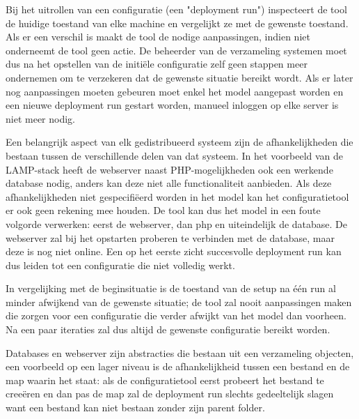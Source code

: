 Bij het uitrollen van een configuratie (een "deployment run") inspecteert de tool de huidige toestand van elke machine en vergelijkt ze met de gewenste toestand.
Als er een verschil is maakt de tool de nodige aanpassingen, indien niet onderneemt de tool geen actie.
De beheerder van de verzameling systemen moet dus na het opstellen van de initi\"ele configuratie zelf geen stappen meer ondernemen om te verzekeren dat de gewenste situatie bereikt wordt.
Als er later nog aanpassingen moeten gebeuren moet enkel het model aangepast worden en een nieuwe deployment run gestart worden, manueel inloggen op elke server is niet meer nodig.


Een belangrijk aspect van elk gedistribueerd systeem zijn de afhankelijkheden die bestaan tussen de verschillende delen van dat systeem.
In het voorbeeld van de LAMP-stack heeft de webserver naast PHP-mogelijkheden ook een werkende database nodig, anders kan deze niet alle functionaliteit aanbieden.
Als deze afhankelijkheden niet gespecifi\"eerd worden in het model kan het configuratietool er ook geen rekening mee houden.
De tool kan dus het model in een foute volgorde verwerken: eerst de webserver, dan php en uiteindelijk de database.
De webserver zal bij het opstarten proberen te verbinden met de database, maar deze is nog niet online.
Een op het eerste zicht succesvolle deployment run kan dus leiden tot een configuratie die niet volledig werkt.

In vergelijking met de beginsituatie is de toestand van de setup na \'e\'en run al minder afwijkend van de gewenste situatie; de tool zal nooit aanpassingen maken die zorgen voor een configuratie die verder afwijkt van het model dan voorheen.
Na een paar iteraties zal dus altijd de gewenste configuratie bereikt worden.

Databases en webserver zijn abstracties die bestaan uit een verzameling objecten, een voorbeeld op een lager niveau is de afhankelijkheid tussen een bestand en de map waarin het staat:
als de configuratietool eerst probeert het bestand te cree\"eren en dan pas de map zal de deployment run slechts gedeeltelijk slagen want een bestand kan niet bestaan zonder zijn parent folder.

